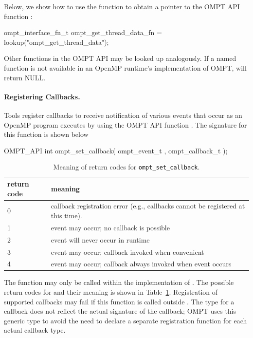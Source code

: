 \documentclass{article}
\begin{document}
Below, we show how to use the  function to obtain a pointer to the OMPT API function :

\begin{boxedcode}
ompt\_interface\_fn\_t ompt\_get\_thread\_data\_fn = lookup("ompt\_get\_thread\_data");
\end{boxedcode}
Other functions in the OMPT API may be looked up analogously.
If a named function is not available in an OpenMP runtime's implementation of OMPT,  will return NULL.

\paragraph{Registering Callbacks.} 
Tools register callbacks to receive notification of various events that occur as an OpenMP program executes by using the OMPT API function . The signature for this function is shown below{
 
\begin{boxedcode}
OMPT\_API int ompt\_set\_callback(
  ompt\_event\_t , 
  ompt\_callback\_t 
);
\end{boxedcode}
}

\begin{table}
\centering
\begin{tabular}{|l|l|}
\hline
return code & meaning \\\hline
0 & callback registration error (e.g., callbacks cannot be registered at this time).\\\hline
1 & event may occur; no callback is possible\\\hline
2 & event will never occur in runtime\\\hline
3 & event may occur; callback invoked when convenient\\\hline
4 & event may occur; callback always invoked when event occurs\\\hline
\end{tabular}
\caption{Meaning of return codes for {\tt ompt\_set\_callback}.}
\label{table:set_rc}
\end{table}

\noindent
The  function   may only be called within the implementation of 
 .
The possible return codes for  and their meaning is shown in Table~\ref{table:set_rc}. 
Registration of supported callbacks may fail if this function is
called outside  .
The  type for a callback does not reflect the actual signature of the callback; OMPT uses  this generic type 
 to avoid the need to declare a separate registration function for each actual callback type.
\end{document}

